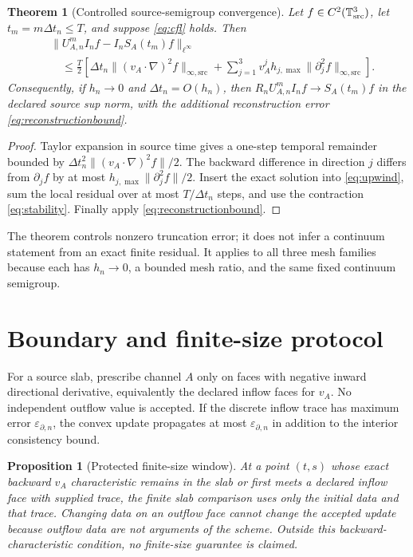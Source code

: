 \documentclass[11pt]{article}
\newcommand{\T}{\mathbb T}
\newtheorem{proposition}{Proposition}
\newtheorem{theorem}{Theorem}
\begin{document}
\begin{theorem}[Controlled source-semigroup convergence]
Let $f\in C^2(\T^3_{\rm src})$, let $t_m=m\Delta t_n\le T$, and suppose
\eqref{eq:cfl} holds.  Then
\begin{align}
 &\|U_{A,n}^{m}I_nf-I_nS_A(t_m)f\|_{\ell^\infty}\nonumber\\
 &\quad\le\frac{T}{2}\left[
 \Delta t_n\|(v_A\cdot\nabla)^2f\|_{\infty,\mathrm{src}}
 +\sum_{j=1}^3v_A^jh_{j,\max}
 \|\partial_j^2f\|_{\infty,\mathrm{src}}\right].
 \label{eq:globalerror}
\end{align}
Consequently, if $h_n\to0$ and $\Delta t_n=O(h_n)$, then
$R_nU_{A,n}^mI_nf\to S_A(t_m)f$ in the declared source sup norm, with the
additional reconstruction error \eqref{eq:reconstructionbound}.
\end{theorem}

\begin{proof}
Taylor expansion in source time gives a one-step temporal remainder bounded by
$\Delta t_n^2\|(v_A\cdot\nabla)^2f\|/2$.  The backward difference in direction
$j$ differs from $\partial_jf$ by at most
$h_{j,\max}\|\partial_j^2f\|/2$.  Insert the exact solution into
\eqref{eq:upwind}, sum the local residual over at most $T/\Delta t_n$ steps,
and use the contraction \eqref{eq:stability}.  Finally apply
\eqref{eq:reconstructionbound}.
\end{proof}

The theorem controls nonzero truncation error; it does not infer a continuum
statement from an exact finite residual.  It applies to all three mesh
families because each has $h_n\to0$, a bounded mesh ratio, and the same fixed
continuum semigroup.

\section{Boundary and finite-size protocol}

For a source slab, prescribe channel $A$ only on faces with negative inward
directional derivative, equivalently the declared inflow faces for $v_A$.
No independent outflow value is accepted.  If the discrete inflow trace has
maximum error $\varepsilon_{\partial,n}$, the convex update propagates at most
$\varepsilon_{\partial,n}$ in addition to the interior consistency bound.

\begin{proposition}[Protected finite-size window]
At a point $(t,s)$ whose exact backward $v_A$ characteristic remains in the
slab or first meets a declared inflow face with supplied trace, the finite
slab comparison uses only the initial data and that trace.  Changing data on
an outflow face cannot change the accepted update because outflow data are not
arguments of the scheme.  Outside this backward-characteristic condition, no
finite-size guarantee is claimed.
\end{proposition}
\end{document}

